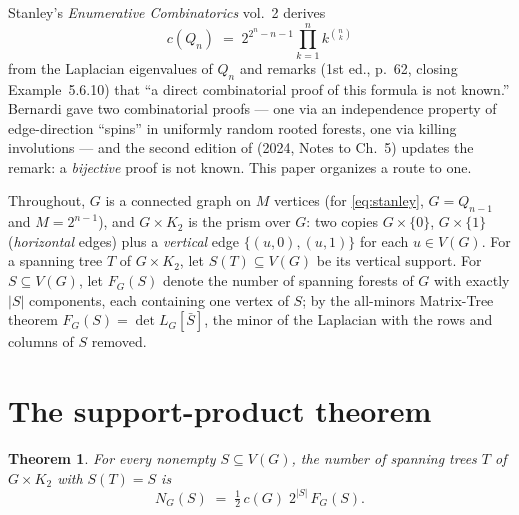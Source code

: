 \documentclass[11pt]{amsart}
\newtheorem{theorem}{Theorem}[section]
\theoremstyle{definition}
\begin{document}
Stanley's \emph{Enumerative Combinatorics} vol.~2 derives
\begin{equation}\label{eq:stanley}
  c(Q_n) \;=\; 2^{2^n-n-1}\prod_{k=1}^{n} k^{\binom nk}
\end{equation}
from the Laplacian eigenvalues of $Q_n$ and remarks (1st ed., p.~62,
closing Example~5.6.10) that ``a direct combinatorial proof of this formula
is not known.'' Bernardi \cite{bernardi} gave two combinatorial proofs ---
one via an independence property of edge-direction ``spins'' in uniformly
random rooted forests, one via killing involutions --- and the second
edition of \cite{ec2} (2024, Notes to Ch.~5) updates the remark: a
\emph{bijective} proof is not known. This paper organizes a route to one.

Throughout, $G$ is a connected graph on $M$ vertices (for
\eqref{eq:stanley}, $G = Q_{n-1}$ and $M = 2^{n-1}$), and
$G\times K_2$ is the prism over $G$: two copies $G\times\{0\}$,
$G\times\{1\}$ (\emph{horizontal} edges) plus a \emph{vertical} edge
$\{(u,0),(u,1)\}$ for each $u\in V(G)$. For a spanning tree $T$ of
$G\times K_2$, let $S(T)\subseteq V(G)$ be its vertical support. For
$S \subseteq V(G)$, let $F_G(S)$ denote the number of spanning forests of
$G$ with exactly $|S|$ components, each containing one vertex of $S$; by
the all-minors Matrix-Tree theorem $F_G(S) = \det L_G[\bar S]$, the minor
of the Laplacian with the rows and columns of $S$ removed.

\section{The support-product theorem}

\begin{theorem}\label{thm:support}
For every nonempty $S\subseteq V(G)$, the number of spanning trees $T$ of
$G\times K_2$ with $S(T)=S$ is
\[
  N_G(S) \;=\; \tfrac12\, c(G)\; 2^{|S|}\, F_G(S).
\]
\end{theorem}
\end{document}
